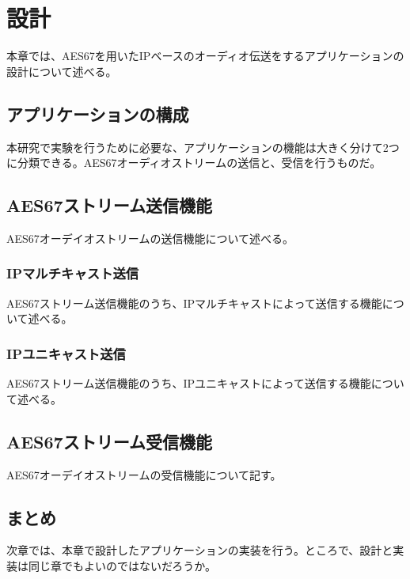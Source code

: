 \chapter{設計}
\label{chap:design}

本章では、AES67を用いたIPベースのオーディオ伝送をするアプリケーションの設計について述べる。

\section{アプリケーションの構成}

本研究で実験を行うために必要な、アプリケーションの機能は大きく分けて2つに分類できる。AES67オーディオストリームの送信と、受信を行うものだ。

\section{AES67ストリーム送信機能}

AES67オーデイオストリームの送信機能について述べる。

\subsection{IPマルチキャスト送信}

AES67ストリーム送信機能のうち、IPマルチキャストによって送信する機能について述べる。

\subsection{IPユニキャスト送信}

AES67ストリーム送信機能のうち、IPユニキャストによって送信する機能について述べる。

\section{AES67ストリーム受信機能}

AES67オーデイオストリームの受信機能について記す。

\section{まとめ}

次章では、本章で設計したアプリケーションの実装を行う。ところで、設計と実装は同じ章でもよいのではないだろうか。
